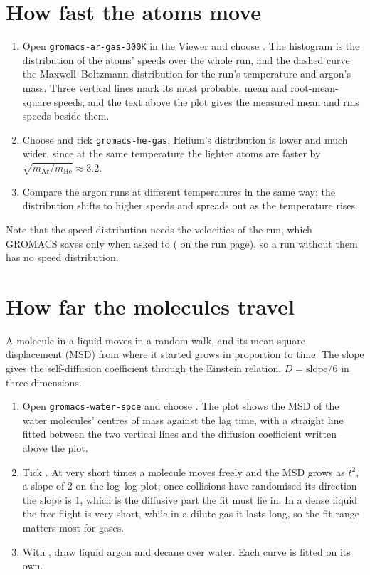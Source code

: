 \section{How fast the atoms move}
\begin{enumerate}
	\item Open \texttt{gromacs-ar-gas-300K} in the Viewer and choose . The histogram is the distribution of the atoms' speeds over the whole run, and the dashed curve the Maxwell--Boltzmann distribution for the run's temperature and argon's mass. Three vertical lines mark its most probable, mean and root-mean-square speeds, and the text above the plot gives the measured mean and rms speeds beside them.
	\item Choose  and tick \texttt{gromacs-he-gas}. Helium's distribution is lower and much wider, since at the same temperature the lighter atoms are faster by $\sqrt{m_\mathrm{Ar}/m_\mathrm{He}} \approx 3.2$.
	\item Compare the argon runs at different temperatures in the same way; the distribution shifts to higher speeds and spreads out as the temperature rises.
\end{enumerate}
Note that the speed distribution needs the velocities of the run, which GROMACS saves only when asked to ( on the run page), so a run without them has no speed distribution.

\section{How far the molecules travel}
A molecule in a liquid moves in a random walk, and its mean-square displacement (MSD) from where it started grows in proportion to time. The slope gives the self-diffusion coefficient through the Einstein relation, $D = \text{slope}/6$ in three dimensions.
\begin{enumerate}
	\item Open \texttt{gromacs-water-spce} and choose . The plot shows the MSD of the water molecules' centres of mass against the lag time, with a straight line fitted between the two vertical lines and the diffusion coefficient written above the plot.
	\item Tick . At very short times a molecule moves freely and the MSD grows as $t^2$, a slope of 2 on the log--log plot; once collisions have randomised its direction the slope is 1, which is the diffusive part the fit must lie in. In a dense liquid the free flight is very short, while in a dilute gas it lasts long, so the fit range matters most for gases.
	\item With , draw liquid argon and decane over water. Each curve is fitted on its own.
\end{enumerate}

